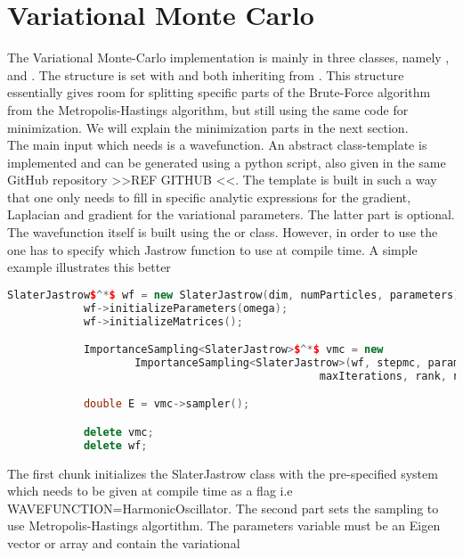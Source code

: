 \section{Variational Monte Carlo}
    The Variational Monte-Carlo implementation is mainly in three classes,
    namely ,  and
    . The structure is set with
     and  both inheriting
    from . This structure essentially gives room for splitting
    specific parts of the Brute-Force algorithm from the Metropolis-Hastings
    algorithm, but still using the same code for minimization. We will explain
    the minimization parts in the next section. \\ 
    The main input which  needs is a wavefunction. An abstract
    class-template is implemented and can be generated using a python script,
    also given in the same GitHub repository >>REF GITHUB <<. The template is
    built in such a way that one only needs to fill in specific analytic
    expressions for the gradient, Laplacian and gradient for the variational
    parameters. The latter part is optional. \\ 
    The wavefunction itself is built using the  or
     class. However, in order to use the
     one has to specify which Jastrow function to use
    at compile time. A simple example illustrates this better
        \begin{lstlisting}[language=C++, style=ccstyle]
            SlaterJastrow$^*$ wf = new SlaterJastrow(dim, numParticles, parameters);
            wf->initializeParameters(omega);
            wf->initializeMatrices();

            ImportanceSampling<SlaterJastrow>$^*$ vmc = new
                    ImportanceSampling<SlaterJastrow>(wf, stepmc, parameters,
                                                 maxIterations, rank, numProcs);

            double E = vmc->sampler();

            delete vmc;
            delete wf;
        \end{lstlisting}
    The first chunk initializes the SlaterJastrow class with the pre-specified
    system which needs to be given at compile time as a flag i.e
    WAVEFUNCTION=HarmonicOscillator. The second part sets the sampling to use
    Metropolis-Hastings algortithm. The parameters variable must be an
    Eigen\cite{eigenweb} vector or array and contain the variational
